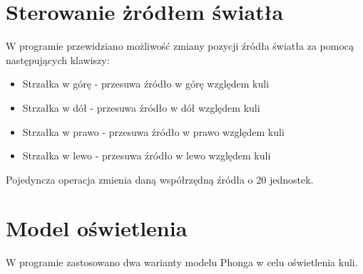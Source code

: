 \documentclass{article}
\begin{document}
\section{Sterowanie żródłem światła}
W programie przewidziano możliwość zmiany pozycji źródła światła za pomocą następujących klawiszy:
\begin{itemize}
    \item Strzałka w górę - przesuwa źródło w górę względem kuli
    \item Strzałka w dół - przesuwa źródło w dół względem kuli 
    \item Strzałka w prawo - przesuwa źródło w prawo względem kuli 
    \item Strzałka w lewo - przesuwa źródło w lewo względem kuli  
\end{itemize}
Pojedyncza operacja zmienia daną współrzędną źródła o 20 jednostek.

\section{Model oświetlenia}
W programie zastosowano dwa warianty modelu Phonga w celu oświetlenia kuli.
\end{document}
